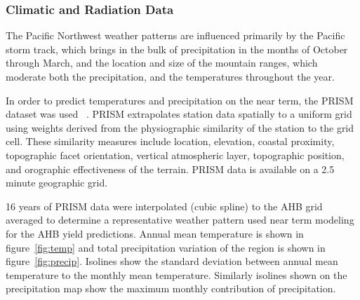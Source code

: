 \documentclass[preprint,12pt]{elsarticle}
\begin{document}
\subsubsection{Climatic and Radiation Data}
\label{sec:climate}


The Pacific Northwest weather patterns are influenced primarily by the
Pacific storm track, which brings in the bulk of precipitation in the
months of October through March, and the location and size of the
mountain ranges, which moderate both the precipitation, and the
temperatures throughout the year.

In order to predict temperatures and precipitation on the near term,
the \acf{PRISM} dataset was used ~\cite{Daly2008}.  \ac{PRISM}
extrapolates station data spatially to a uniform grid using weights
derived from the physiographic similarity of the station to the grid
cell. These similarity measures include location, elevation, coastal
proximity, topographic facet orientation, vertical atmospheric layer,
topographic position, and orographic effectiveness of the terrain.
\ac{PRISM} data is available on a 2.5 minute geographic grid.

16 years of \ac{PRISM} data were interpolated (cubic spline) to the
\ac{AHB} grid averaged to determine a representative weather pattern
used near term modeling for the \ac{AHB} yield predictions.
Annual mean temperature is shown in figure~\ref{fig:temp} and total
precipitation variation of the region is shown in figure~\ref{fig:precip}.  Isolines show the standard
deviation between annual mean temperature to the monthly mean
temperature.  Similarly isolines shown on the precipitation map show
the maximum monthly contribution of precipitation.
\end{document}
